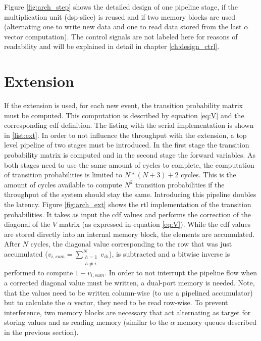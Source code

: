 \documentclass[mscthesis]{usiinfthesis}
\begin{document}
Figure \ref{fig:arch_step} shows the detailed design of one pipeline stage, if
the multiplication unit (\gls{dsp}-slice) is reused and if two memory blocks
are used (alternating one to write new data and one to read data stored from
the last $\alpha$ vector computation). The control signals are not labeled here
for reasons of readability and will be explained in detail in chapter
\ref{ch:design_ctrl}.

\section{Extension}
\label{ch:design_ext}

If the extension is used, for each new event, the transition probability matrix
must be computed. This computation is described by equation \ref{eq:V} and the
corresponding \gls{cdf} definition. The listing with the serial implementation
is shown in \ref{list:ext}. In order to not influence the throughput with the
extension, a top level pipeline of two stages must be introduced. In the first
stage the transition probability matrix is computed and in the second stage the
forward variables. As both stages need to use the same amount of cycles to
complete, the computation of transition probabilities is limited to $N*(N+3)+2$
cycles. This is the amount of cycles available to compute $N^2$ transition
probabilities if the throughput of the system should stay the same. Introducing
this pipeline doubles the latency. Figure \ref{fig:arch_ext} shows the
\gls{rtl} implementation of the transition probabilities. It takes as input the
\gls{cdf} values and performs the correction of the diagonal of the $V$ matrix
(as expressed in equation \ref{eq:V}). While the \gls{cdf} values are stored
directly into an internal memory block, the elements are accumulated. After $N$
cycles, the diagonal value corresponding to the row that was just accumulated
($v_{i, sum} = \sum\limits_{\substack{h=1 \\ h \neq i}}^{N} v_{ih}$), is
subtracted and a bitwise inverse is performed to compute $1 - v_{i, sum}$. In
order to not interrupt the pipeline flow when a corrected diagonal value must
be written, a dual-port memory is needed. Note, that the values need to be
written column-wise (to use a pipelined accumulator) but to calculate the
$\alpha$ vector, they need to be read row-wise. To prevent interference, two
memory blocks are necessary that act alternating as target for storing values
and as reading memory (similar to the $\alpha$ memory queues described in the
previous section).
\end{document}
